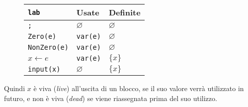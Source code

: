 \begin{figure}[H]
    \centering
    \begin{tabular}{l|l|l}
    \texttt{lab} & Usate & Definite\\
    \hline
    \texttt{;} & $\varnothing$ & $\varnothing$\\
    \texttt{Zero(e)} & \texttt{var(e)}& $\varnothing$\\
    \texttt{NonZero(e)} & \texttt{var(e)}& $\varnothing$\\
    \texttt{$x \gets e$} & \texttt{var(e)}& $\{x\}$\\
    \texttt{\texttt{input(x)}} & $\varnothing$ & $\{x\}$\\
    \end{tabular}
\end{figure}
Quindi $x$ è viva (\textit{live}) all'uscita di un blocco, se il suo valore verrà utilizzato in 
futuro, e non è viva (\textit{dead}) se viene riassegnata prima del suo utilizzo.

